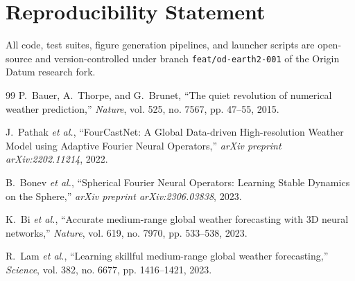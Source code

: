 \documentclass[10pt,twocolumn,letterpaper]{article}
\begin{document}
\section*{Reproducibility Statement}
All code, test suites, figure generation pipelines, and launcher scripts are open-source and version-controlled under branch \texttt{feat/od-earth2-001} of the Origin Datum research fork.

\begin{thebibliography}{99}
P.~Bauer, A.~Thorpe, and G.~Brunet, ``The quiet revolution of numerical weather prediction,'' \emph{Nature}, vol. 525, no. 7567, pp. 47--55, 2015.

J.~Pathak \emph{et al.}, ``FourCastNet: A Global Data-driven High-resolution Weather Model using Adaptive Fourier Neural Operators,'' \emph{arXiv preprint arXiv:2202.11214}, 2022.

B.~Bonev \emph{et al.}, ``Spherical Fourier Neural Operators: Learning Stable Dynamics on the Sphere,'' \emph{arXiv preprint arXiv:2306.03838}, 2023.

K.~Bi \emph{et al.}, ``Accurate medium-range global weather forecasting with 3D neural networks,'' \emph{Nature}, vol. 619, no. 7970, pp. 533--538, 2023.

R.~Lam \emph{et al.}, ``Learning skillful medium-range global weather forecasting,'' \emph{Science}, vol. 382, no. 6677, pp. 1416--1421, 2023.
\end{thebibliography}
\end{document}
